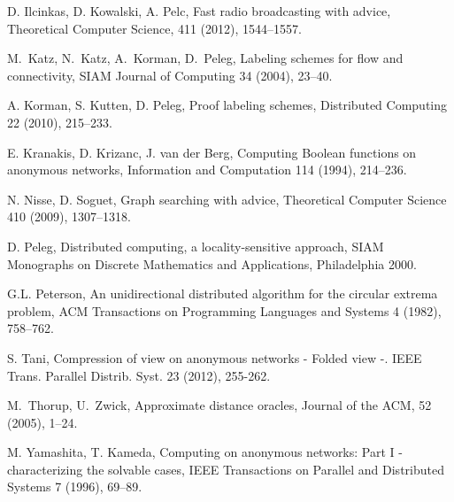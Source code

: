 \documentclass{article}
\begin{document}
\begin{thebibliography}{99}
D. Ilcinkas, D. Kowalski, A. Pelc, 
Fast radio broadcasting with advice, 
 Theoretical Computer Science, 411 (2012),  1544--1557.

M.~Katz, N.~Katz, A.~Korman, D.~Peleg, Labeling schemes for flow and
connectivity, 
SIAM Journal of  Computing 34 (2004), 23--40.



A. Korman, S. Kutten, D. Peleg, Proof labeling schemes,
Distributed Computing 22 (2010), 215--233.  



E. Kranakis, D. Krizanc,  J. van der Berg,
Computing Boolean functions on anonymous networks,
Information and Computation 114 (1994), 214--236.


N. Nisse, D. Soguet, Graph searching with advice,
Theoretical Computer Science 410 (2009), 1307--1318.

 D. Peleg,
  Distributed computing, a locality-sensitive approach,
  SIAM Monographs on Discrete Mathematics and Applications, Philadelphia 2000.

G.L. Peterson, An  unidirectional distributed algorithm
for the circular extrema problem,
 ACM Transactions on Programming Languages and Systems 4 (1982), 758--762.
 
 S. Tani,  Compression of view on anonymous networks - Folded view -. IEEE Trans. Parallel Distrib. Syst. 23 (2012), 255-262.


M.~Thorup, U.~Zwick, Approximate distance oracles,
Journal of the ACM, 52 (2005), 1--24.


M. Yamashita, T. Kameda,
Computing on anonymous networks: Part I - characterizing the solvable cases,
IEEE Transactions on Parallel and Distributed Systems 7 (1996), 69--89. 

\end{thebibliography}
\end{document}
